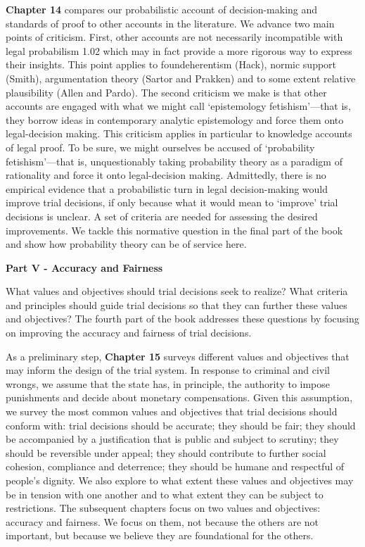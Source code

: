 \documentclass[
  10pt,
  dvipsnames,enabledeprecatedfontcommands]{scrartcl}
\begin{document}
\textbf{Chapter 14} compares our probabilistic account of
decision-making and standards of proof to other accounts in the
literature. We advance two main points of criticism. First, other
accounts are not necessarily incompatible with legal probabilism 1.02
which may in fact provide a more rigorous way to express their insights.
This point applies to foundeherentism (Hack), normic support (Smith),
argumentation theory (Sartor and Prakken) and to some extent relative
plausibility (Allen and Pardo). The second criticism we make is that
other accounts are engaged with what we might call `epistemology
fetishism'---that is, they borrow ideas in contemporary analytic
epistemology and force them onto legal-decision making. This criticism
applies in particular to knowledge accounts of legal proof. To be sure,
we might ourselves be accused of `probability fetishism'---that is,
unquestionably taking probability theory as a paradigm of rationality
and force it onto legal-decision making. Admittedly, there is no
empirical evidence that a probabilistic turn in legal decision-making
would improve trial decisions, if only because what it would mean to
`improve' trial decisions is unclear. A set of criteria are needed for
assessing the desired improvements. We tackle this normative question in
the final part of the book and show how probability theory can be of
service here.

\vspace{3mm}

\noindent \textbf{Part V - Accuracy and Fairness}

\noindent What values and objectives should trial decisions seek to
realize? What criteria and principles should guide trial decisions so
that they can further these values and objectives? The fourth part of
the book addresses these questions by focusing on improving the accuracy
and fairness of trial decisions.

As a preliminary step, \textbf{Chapter 15} surveys different values and
objectives that may inform the design of the trial system. In response
to criminal and civil wrongs, we assume that the state has, in
principle, the authority to impose punishments and decide about monetary
compensations. Given this assumption, we survey the most common values
and objectives that trial decisions should conform with: trial decisions
should be accurate; they should be fair; they should be accompanied by a
justification that is public and subject to scrutiny; they should be
reversible under appeal; they should contribute to further social
cohesion, compliance and deterrence; they should be humane and
respectful of people's dignity. We also explore to what extent these
values and objectives may be in tension with one another and to what
extent they can be subject to restrictions. The subsequent chapters
focus on two values and objectives: accuracy and fairness. We focus on
them, not because the others are not important, but because we believe
they are foundational for the others.
\end{document}
